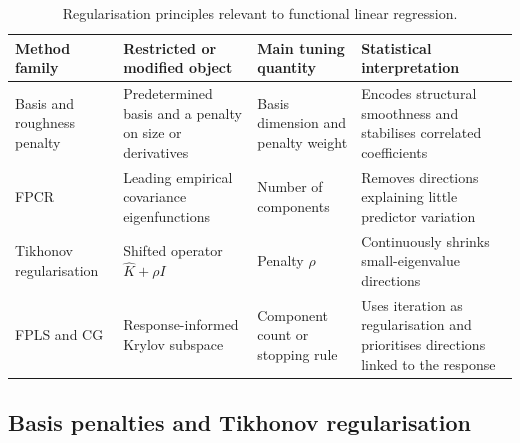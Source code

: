 \begin{table}[htbp]
    \centering
    \small
    \caption[Regularisation principles for functional linear regression]{Regularisation principles relevant to functional linear regression.}
    \label{tab:regularisation-principles}
    \begin{tabular}{@{}
        >{\raggedright\arraybackslash}p{2.5cm}
        >{\raggedright\arraybackslash}p{3.2cm}
        >{\raggedright\arraybackslash}p{2.2cm}
        >{\raggedright\arraybackslash}p{5.3cm}@{}}
        \toprule
        Method family & Restricted or modified object & Main tuning quantity & Statistical interpretation \\
        \midrule
        Basis and roughness penalty
        & Predetermined basis and a penalty on size or derivatives
        & Basis dimension and penalty weight
        & Encodes structural smoothness and stabilises correlated coefficients \\
        FPCR
        & Leading empirical covariance eigenfunctions
        & Number of components
        & Removes directions explaining little predictor variation \\
        Tikhonov regularisation
        & Shifted operator $\widehat K+\rho I$
        & Penalty $\rho$
        & Continuously shrinks small-eigenvalue directions \\
        FPLS and CG
        & Response-informed Krylov subspace
        & Component count or stopping rule
        & Uses iteration as regularisation and prioritises directions linked to the response \\
        \bottomrule
    \end{tabular}
\end{table}

\subsection{Basis penalties and Tikhonov regularisation}

